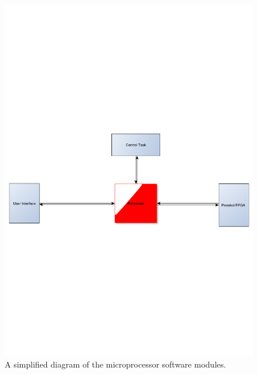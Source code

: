 \begin{figure}[htb]
	\centering
	\includegraphics[scale=0.58,clip,trim=0 300 0 300]{graphics/microprocessor} %
	\caption{A simplified diagram of the microprocessor software modules.}
	\label{fig:microprocessor}			%
\end{figure}


